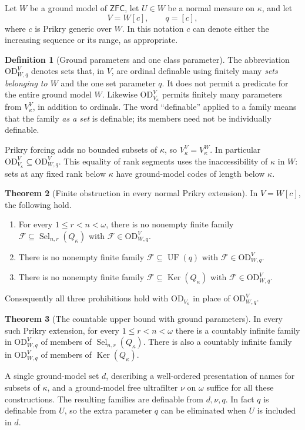 \documentclass[11pt,letterpaper]{article}
\theoremstyle{definition}
\newtheorem{definition}{Definition}[section]
\newtheorem{theorem}[definition]{Theorem}
\numberwithin{equation}{section}
\newcommand{\ZFC}{\mathsf{ZFC}}
\newcommand{\OD}{\mathrm{OD}}
\newcommand{\FF}{\mathcal F}
\newcommand{\UF}{\operatorname{UF}}
\newcommand{\Sel}{\operatorname{Sel}}
\newcommand{\Ker}{\operatorname{Ker}}
\newcommand{\ODW}{\OD^{V}_{W,q}}
\newcommand{\ODlow}{\OD^{V}_{V_\kappa}}
\begin{document}
Let $W$ be a ground model of $\ZFC$, let $U\in W$ be a normal measure on $\kappa$, and let
\[
V=W[c],\qquad q=[c],
\]
where $c$ is Prikry generic over $W$. In this notation $c$ can denote either the increasing sequence or its range, as appropriate.

\begin{definition}[Ground parameters and one class parameter]\label{def:parameters}
The abbreviation $\ODW$ denotes sets that, in $V$, are ordinal definable using finitely many \emph{sets belonging to $W$} and the one set parameter $q$. It does not permit a predicate for the entire ground model $W$. Likewise $\ODlow$ permits finitely many parameters from $V_\kappa^V$, in addition to ordinals. The word ``definable'' applied to a family means that the family \emph{as a set} is definable; its members need not be individually definable.
\end{definition}

Prikry forcing adds no bounded subsets of $\kappa$, so $V_\kappa^V=V_\kappa^W$. In particular $\ODlow\subseteq\ODW$. This equality of rank segments uses the inaccessibility of $\kappa$ in $W$: sets at any fixed rank below $\kappa$ have ground-model codes of length below $\kappa$.

\begin{theorem}[Finite obstruction in every normal Prikry extension]\label{thm:finite-main}
In $V=W[c]$, the following hold.
\begin{enumerate}
\item For every $1\le r<n<\omega$, there is no nonempty finite family
$\FF\subseteq\Sel_{n,r}(Q_\kappa)$ with $\FF\in\ODW$.
\item There is no nonempty finite family $\FF\subseteq\UF(q)$ with $\FF\in\ODW$.
\item There is no nonempty finite family $\FF\subseteq\Ker(Q_\kappa)$ with $\FF\in\ODW$.
\end{enumerate}
Consequently all three prohibitions hold with $\OD_{V_\kappa}$ in place of $\ODW$.
\end{theorem}

\begin{theorem}[The countable upper bound with ground parameters]\label{thm:count-main}
In every such Prikry extension, for every $1\le r<n<\omega$ there is a countably infinite family in $\ODW$ of members of $\Sel_{n,r}(Q_\kappa)$. There is also a countably infinite family in $\ODW$ of members of $\Ker(Q_\kappa)$.

A single ground-model set $d$, describing a well-ordered presentation of names for subsets of $\kappa$, and a ground-model free ultrafilter $\nu$ on $\omega$ suffice for all these constructions. The resulting families are definable from $d,\nu,q$. In fact $q$ is definable from $U$, so the extra parameter $q$ can be eliminated when $U$ is included in $d$.
\end{theorem}
\end{document}
